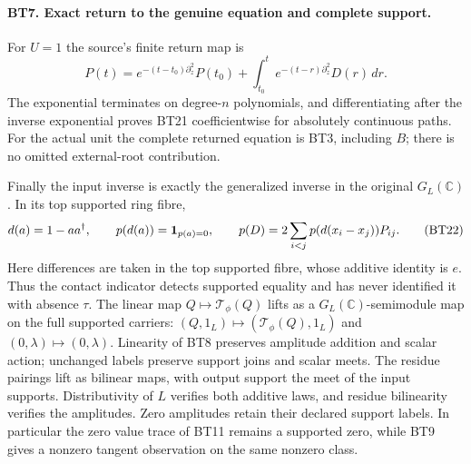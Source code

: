\paragraph{BT7. Exact return to the genuine equation and complete support.}
For $U=1$ the source's finite return map is
\[
 P(t)=e^{-(t-t_0)\partial_z^2}P(t_0)
       +\int_{t_0}^t e^{-(t-r)\partial_z^2}D(r)\,dr.
 \tag{BT21}
\]
The exponential terminates on degree-$n$ polynomials, and
differentiating after the inverse exponential proves BT21
coefficientwise for absolutely continuous paths. For the actual
unit the complete returned equation is BT3, including $B$;
there is no omitted external-root contribution.

Finally the input inverse is exactly the generalized inverse in
the original $G_L(\mathbb C)$. In its top supported ring fibre,
\[
 d(a)=1-aa^\dagger,
 \qquad p(d(a))={\bf1}_{p(a)=0},\qquad
 p(D)=2\sum_{i<j}p(d(x_i-x_j))P_{ij}.
 \tag{BT22}
\]
Here differences are taken in the top supported fibre, whose
additive identity is $e$. Thus the contact indicator detects
supported equality and has never identified it with absence
$\tau$. The linear map $Q\mapsto\mathcal T_\phi(Q)$ lifts as a
$G_L(\mathbb C)$-semimodule map on the full supported carriers:
$(Q,1_L)\mapsto(\mathcal T_\phi(Q),1_L)$ and
$(0,\lambda)\mapsto(0,\lambda)$. Linearity of BT8 preserves
amplitude addition and scalar action; unchanged labels preserve
support joins and scalar meets. The residue pairings lift as
bilinear maps, with output support the meet of the input supports.
Distributivity of $L$ verifies both additive laws, and residue
bilinearity verifies the amplitudes. Zero amplitudes retain their
declared support labels. In particular the
zero value trace of BT11 remains a supported zero, while BT9
gives a nonzero tangent observation on the same nonzero class.

